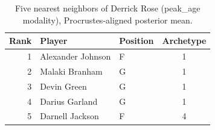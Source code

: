 \begin{table}[htbp]
  \centering\small
  \begin{tabular}{rllc}
    \toprule
    Rank & Player & Position & Archetype \\
    \midrule
    1 & Alexander Johnson & F & 1 \\
    2 & Malaki Branham & G & 1 \\
    3 & Devin Green & G & 1 \\
    4 & Darius Garland & G & 1 \\
    5 & Darnell Jackson & F & 4 \\
    \bottomrule
  \end{tabular}
  \caption{Five nearest neighbors of Derrick Rose (peak_age modality), Procrustes-aligned posterior mean.}
  \label{tab:Derrick_Rose_neighbors_peak_age}
\end{table}

